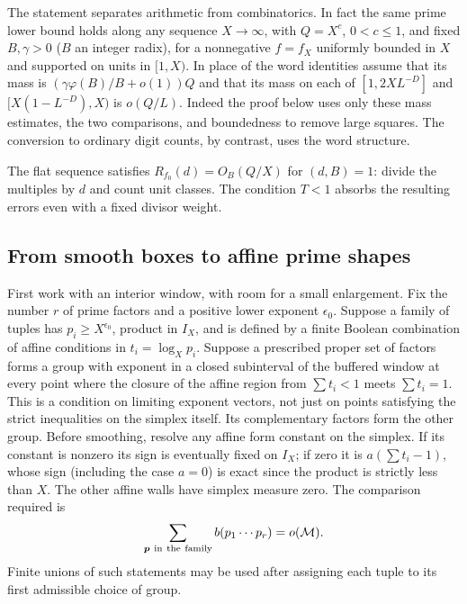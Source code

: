 \documentclass[11pt,a4paper]{article}
\theoremstyle{paperplain}
\numberwithin{equation}{section}
\begin{document}
The statement separates arithmetic from combinatorics. In fact the
same prime lower bound holds along any sequence $X\to\infty$, with
$Q=X^c$, $0<c\le1$, and fixed $B,\gamma>0$ ($B$ an integer radix),
for a nonnegative $f=f_X$ uniformly bounded in $X$ and supported on units in $[1,X)$.
In place of the word identities assume that its mass is
$(\gamma\varphi(B)/B+o(1))Q$ and that its mass on each of
$[1,2XL^{-D}]$ and $[X(1-L^{-D}),X)$ is $o(Q/L)$.
Indeed the proof below uses only these mass estimates, the two
comparisons, and boundedness to remove large squares. The conversion
to ordinary digit counts, by contrast, uses the word structure.

The flat sequence satisfies $R_{f_0}(d)=O_B(Q/X)$ for $(d,B)=1$:
divide the multiples by $d$ and count unit classes. The condition
$T<1$ absorbs the resulting errors even with a fixed divisor weight.

\subsection{From smooth boxes to affine prime shapes}
\label{dt:sieve-smooth-shapes}
First work with an interior window, with room for a small enlargement. Fix the
number \(r\) of prime factors and a positive lower exponent
\(\epsilon_0\). Suppose a family of tuples has
\(p_i\ge X^{\epsilon_0}\), product in \(I_X\), and is defined by a
finite Boolean combination of affine conditions in
\(t_i=\log_X p_i\). Suppose a prescribed proper set of factors
forms a group with exponent in a closed subinterval of the buffered window at every point where the closure of the
affine region from $\sum t_i<1$ meets $\sum t_i=1$. This is a
condition on limiting exponent vectors, not just on points satisfying
the strict inequalities on the simplex itself.
Its complementary factors form the other group. Before smoothing, resolve any affine form constant on
the simplex. If its constant is nonzero its sign is eventually fixed
on $I_X$; if zero it is $a(\sum t_i-1)$, whose sign (including the
case $a=0$) is exact since the product is strictly less than $X$.
The other affine walls have simplex measure zero. The comparison required is
\begin{equation}
 \sum_{\boldsymbol p\ {\rm in\ the\ family}} b(p_1\cdots p_r)
       =o(\mathcal M).
 \label{dt:sieve-flat-comparison}
\end{equation}
Finite unions of such statements may be used after assigning each
tuple to its first admissible choice of group.
\end{document}
